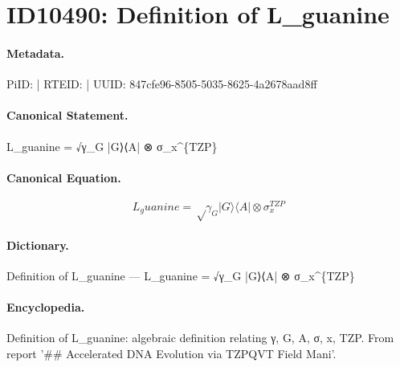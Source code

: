 \section*{ID10490: Definition of L\_guanine}
\paragraph{Metadata.}
PiID:  | RTEID:  | UUID: 847cfe96-8505-5035-8625-4a2678aad8ff

\paragraph{Canonical Statement.}
L\_guanine = √γ\_G |G⟩⟨A| ⊗ σ\_x\textasciicircum{}\{TZP\}

\paragraph{Canonical Equation.}
\[
L_guanine = √γ_G |G⟩⟨A| ⊗ σ_x^{TZP}
\]

\paragraph{Dictionary.}
Definition of L\_guanine — L\_guanine = √γ\_G |G⟩⟨A| ⊗ σ\_x\textasciicircum{}\{TZP\}

\paragraph{Encyclopedia.}
Definition of L\_guanine: algebraic definition relating γ, G, A, σ, x, TZP. From report '\#\# Accelerated DNA Evolution via TZPQVT Field Mani'.
